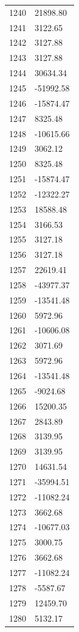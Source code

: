\documentclass[a4paper,11pt]{article}
\begin{document}
\begin{center}
\begin{longtable}{|R{1.5cm}|R{2.6cm}|}
 1240 &     21898.80 \\
 1241 &      3122.65 \\
 1242 &      3127.88 \\
 1243 &      3127.88 \\
 1244 &     30634.34 \\
 1245 &    -51992.58 \\
 1246 &    -15874.47 \\
 1247 &      8325.48 \\
 1248 &    -10615.66 \\
 1249 &      3062.12 \\
 1250 &      8325.48 \\
 1251 &    -15874.47 \\
 1252 &    -12322.27 \\
 1253 &     18588.48 \\
 1254 &      3166.53 \\
 1255 &      3127.18 \\
 1256 &      3127.18 \\
 1257 &     22619.41 \\
 1258 &    -43977.37 \\
 1259 &    -13541.48 \\
 1260 &      5972.96 \\
 1261 &    -10606.08 \\
 1262 &      3071.69 \\
 1263 &      5972.96 \\
 1264 &    -13541.48 \\
 1265 &     -9024.68 \\
 1266 &     15200.35 \\
 1267 &      2843.89 \\
 1268 &      3139.95 \\
 1269 &      3139.95 \\
 1270 &     14631.54 \\
 1271 &    -35994.51 \\
 1272 &    -11082.24 \\
 1273 &      3662.68 \\
 1274 &    -10677.03 \\
 1275 &      3000.75 \\
 1276 &      3662.68 \\
 1277 &    -11082.24 \\
 1278 &     -5587.67 \\
 1279 &     12459.70 \\
 1280 &      5132.17 \\

\end{longtable}
\end{center}
\end{document}
